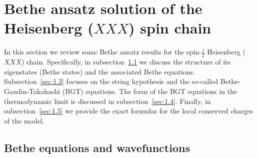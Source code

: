 \documentclass[11pt]{iopart}
\begin{document}
%
%


%
%

\section{Bethe ansatz solution of the Heisenberg ($XXX$) spin chain}
\label{sec:1}

In this section we review some Bethe ansatz results for the spin-$\frac{1}{2}$ Heisenberg 
($XXX$) chain. Specifically, in subsection~\ref{sec:1.2} we discuss the structure of  
its eigenstates (Bethe states) and the associated Bethe equations. 
Subsection~\ref{sec:1.3} focuses on the string hypothesis 
and the so-called Bethe-Gaudin-Takahashi (BGT) equations. The form of the 
BGT equations in the thermodynamic limit is discussed in subsection~\ref{sec:1.4}. 
Finally, in subsection~\ref{sec:1.5} we provide the exact formulas for the 
local conserved charges of the model. 





\subsection{Bethe equations and wavefunctions}
\label{sec:1.2}
\end{document}
